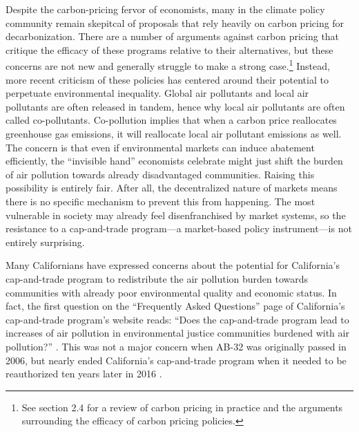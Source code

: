 Despite the carbon-pricing fervor of economists, many in the climate policy community remain skepitcal of proposals that rely heavily on carbon pricing for decarbonization. There are a number of arguments against carbon pricing that critique the efficacy of these programs relative to their alternatives, but these concerns are not new and generally struggle to make a strong case.\footnote{See section 2.4 for a review of carbon pricing in practice and the arguments surrounding the efficacy of carbon pricing policies.} Instead, more recent criticism of these policies has centered around their potential to perpetuate environmental inequality. Global air pollutants and local air pollutants are often released in tandem, hence why local air pollutants are often called co-pollutants. Co-pollution implies that when a carbon price reallocates greenhouse gas emissions, it will reallocate local air pollutant emissions as well. The concern is that even if environmental markets can induce abatement efficiently, the ``invisible hand'' economists celebrate might just shift the burden of air pollution towards already disadvantaged communities. Raising this possibility is entirely fair. After all, the decentralized nature of markets means there is no specific mechanism to prevent this from happening. The most vulnerable in society may already feel disenfranchised by market systems, so the resistance to a cap-and-trade program---a market-based policy instrument---is not entirely surprising. 

Many Californians have expressed concerns about the potential for California's cap-and-trade program to redistribute the air pollution burden towards communities with already poor environmental quality and economic status. In fact, the first question on the ``Frequently Asked Questions'' page of California's cap-and-trade program's website reads: ``Does the cap-and-trade program lead to increases of air pollution in environmental justice communities burdened with air pollution?'' \citep{carb_FAQ}. This was not a major concern when AB-32 was originally passed in 2006, but nearly ended California's cap-and-trade program when it needed to be reauthorized ten years later in 2016 \citep{johnson2020cap}. 



